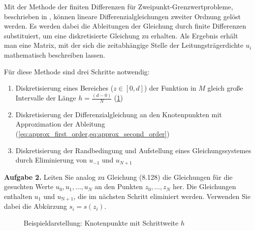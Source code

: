 	Mit der Methode der finiten Differenzen für Zweipunkt-Grenzwertprobleme, beschrieben in \cite[p. 442]{Atkinson.2004}, können lineare Differenzialgleichungen zweiter Ordnung gelöst werden. Es werden dabei die Ableitungen der Gleichung durch finite Differenzen substituiert, um eine diskretisierte Gleichung zu erhalten.
	Als Ergebnis erhält man eine Matrix, mit der sich die zeitabhängige Stelle der Leitungsträgerdichte $u_i$ mathematisch beschreiben lassen. 
	
	Für diese Methode sind drei Schritte notwendig:
	\begin{enumerate}
		\item Diskretisierung eines Bereiches ($z\in [0,d]$) der Funktion in $M$ gleich große Intervalle der Länge $h=\frac{(d-0)}{N}$ (\cref{fig:bsp_knotenpunkte})
		\item Diskretisierung der Differenzialgleichung an den Knotenpunkten mit Approximation der Ableitung (\cref{eq:approx_first_order,eq:approx_second_order})
		\item Diskretisierung der Randbedingung und Aufstellung eines Gleichungssystemes durch Eliminierung von $u_{-1}$ und $u_{N+1}$
	\end{enumerate}

 \begin{mybox}
	\textbf{Aufgabe 2.} Leiten Sie analog zu Gleichung (8.128) die Gleichungen für die gesuchten Werte  $u_0, u_1, \dots , u_N$ an den Punkten $z_0,\dots, z_N$ her. Die Gleichungen enthalten $u_1$ und $u_\mathrm{N+1}$, die im nächsten Schritt eliminiert werden. Verwenden Sie dabei die Abkürzung $ s_i = s(z_i)$.\cite{Prof.Dr.AndreasZeiser.April2021} 
\end{mybox}
	
 
 \begin{figure}[htb]
 	\centering
\caption{Beispieldarstellung: Knotenpunkte mit Schrittweite $h$}
\label{fig:bsp_knotenpunkte}
 \end{figure}

